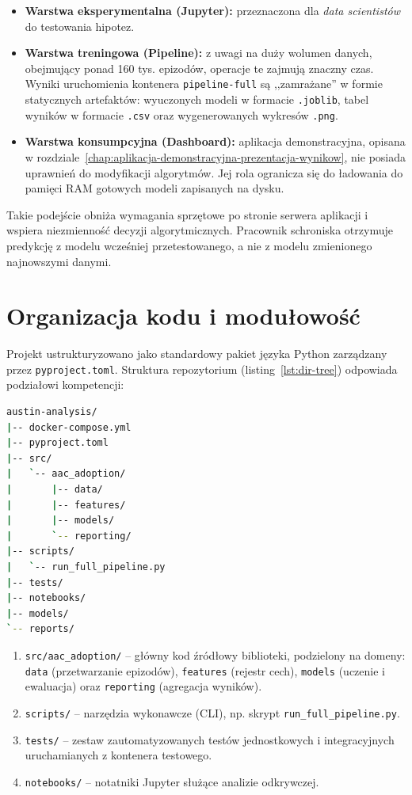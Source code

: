\begin{itemize}
    \item \textbf{Warstwa eksperymentalna (Jupyter):} przeznaczona dla \emph{data scientistów} do testowania hipotez.
    \item \textbf{Warstwa treningowa (Pipeline):} z uwagi na duży wolumen danych, obejmujący ponad 160 tys. epizodów, operacje te zajmują znaczny czas. Wyniki uruchomienia kontenera \texttt{pipeline-full} są ,,zamrażane'' w formie statycznych artefaktów: wyuczonych modeli w formacie \texttt{.joblib}, tabel wyników w formacie \texttt{.csv} oraz wygenerowanych wykresów \texttt{.png}.
    \item \textbf{Warstwa konsumpcyjna (Dashboard):} aplikacja demonstracyjna, opisana w rozdziale~\ref{chap:aplikacja-demonstracyjna-prezentacja-wynikow}, nie posiada uprawnień do modyfikacji algorytmów. Jej rola ogranicza się do ładowania do pamięci RAM gotowych modeli zapisanych na dysku.
\end{itemize}

Takie podejście obniża wymagania sprzętowe po stronie serwera aplikacji i wspiera niezmienność decyzji algorytmicznych. Pracownik schroniska otrzymuje predykcję z modelu wcześniej przetestowanego, a nie z modelu zmienionego najnowszymi danymi.

\section{Organizacja kodu i modułowość}
\label{sec:organizacja-kodu-modulowosc}

Projekt ustrukturyzowano jako standardowy pakiet języka Python zarządzany przez \texttt{pyproject.toml}. Struktura repozytorium (listing~\ref{lst:dir-tree}) odpowiada podziałowi kompetencji:

\begin{lstlisting}[language=bash, caption={Drzewo katalogów głównego projektu}, label={lst:dir-tree}]
austin-analysis/
|-- docker-compose.yml
|-- pyproject.toml
|-- src/
|   `-- aac_adoption/
|       |-- data/
|       |-- features/
|       |-- models/
|       `-- reporting/
|-- scripts/
|   `-- run_full_pipeline.py
|-- tests/
|-- notebooks/
|-- models/
`-- reports/
\end{lstlisting}

\begin{enumerate}
    \item \texttt{src/aac\_adoption/} -- główny kod źródłowy biblioteki, podzielony na domeny: \texttt{data} (przetwarzanie epizodów), \texttt{features} (rejestr cech), \texttt{models} (uczenie i ewaluacja) oraz \texttt{reporting} (agregacja wyników).
    \item \texttt{scripts/} -- narzędzia wykonawcze (CLI), np. skrypt \texttt{run\_full\_pipeline.py}.
    \item \texttt{tests/} -- zestaw zautomatyzowanych testów jednostkowych i integracyjnych uruchamianych z kontenera testowego.
    \item \texttt{notebooks/} -- notatniki Jupyter służące analizie odkrywczej.
\end{enumerate}

